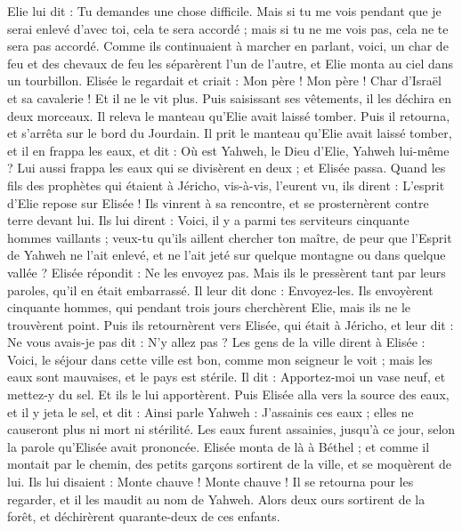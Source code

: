 \begin{multicols}{2}
Elie lui dit : Tu demandes une chose difficile. Mais si tu me vois pendant que je serai enlevé d’avec toi, cela te sera accordé ; mais si tu ne me vois pas, cela ne te sera pas accordé.
Comme ils continuaient à marcher en parlant, voici, un char de feu et des chevaux de feu les séparèrent l’un de l’autre, et Elie monta au ciel dans un tourbillon.
Elisée le regardait et criait : Mon père ! Mon père ! Char d’Israël et sa cavalerie ! Et il ne le vit plus. Puis saisissant ses vêtements, il les déchira en deux morceaux.
Il releva le manteau qu’Elie avait laissé tomber. Puis il retourna, et s’arrêta sur le bord du Jourdain.
Il prit le manteau qu’Elie avait laissé tomber, et il en frappa les eaux, et dit : Où est Yahweh, le Dieu d’Elie, Yahweh lui-même ? Lui aussi frappa les eaux qui se divisèrent en deux ; et Elisée passa.
Quand les fils des prophètes qui étaient à Jéricho, vis-à-vis, l’eurent vu, ils dirent : L’esprit d’Elie repose sur Elisée ! Ils vinrent à sa rencontre, et se prosternèrent contre terre devant lui.
Ils lui dirent : Voici, il y a parmi tes serviteurs cinquante hommes vaillants ; veux-tu qu’ils aillent chercher ton maître, de peur que l’Esprit de Yahweh ne l’ait enlevé, et ne l’ait jeté sur quelque montagne ou dans quelque vallée ? Elisée répondit : Ne les envoyez pas.
Mais ils le pressèrent tant par leurs paroles, qu’il en était embarrassé. Il leur dit donc : Envoyez-les. Ils envoyèrent cinquante hommes, qui pendant trois jours cherchèrent Elie, mais ils ne le trouvèrent point.
Puis ils retournèrent vers Elisée, qui était à Jéricho, et leur dit : Ne vous avais-je pas dit : N’y allez pas ?
Les gens de la ville dirent à Elisée : Voici, le séjour dans cette ville est bon, comme mon seigneur le voit ; mais les eaux sont mauvaises, et le pays est stérile.
Il dit : Apportez-moi un vase neuf, et mettez-y du sel. Et ils le lui apportèrent.
Puis Elisée alla vers la source des eaux, et il y jeta le sel, et dit : Ainsi parle Yahweh : J’assainis ces eaux ; elles ne causeront plus ni mort ni stérilité.
Les eaux furent assainies, jusqu’à ce jour, selon la parole qu’Elisée avait prononcée.
Elisée monta de là à Béthel ; et comme il montait par le chemin, des petits garçons sortirent de la ville, et se moquèrent de lui. Ils lui disaient : Monte chauve ! Monte chauve !
Il se retourna pour les regarder, et il les maudit au nom de Yahweh. Alors deux ours sortirent de la forêt, et déchirèrent quarante-deux de ces enfants.

\end{multicols}
